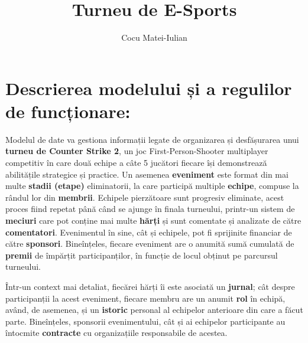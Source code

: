 \documentclass[a4paper,11pt]{article}
\title{\Huge Turneu de E-Sports}
\author{Cocu Matei-Iulian}
\begin{document}
\maketitle

\section{Descrierea modelului și a regulilor de funcționare:}
\quad Modelul de date va gestiona informații legate de organizarea și desfășurarea unui \textbf{turneu de Counter Strike 2}, un joc First-Person-Shooter multiplayer competitiv în care două echipe a câte 5 jucători fiecare își demonstrează abilitățile strategice și practice.
Un asemenea \textbf{eveniment} este format din mai multe \textbf{stadii (etape)} eliminatorii,
la care participă multiple \textbf{echipe}, compuse la rândul lor din \textbf{membrii}. Echipele pierzătoare sunt progresiv eliminate, acest proces fiind repetat până când se ajunge în finala turneului, printr-un sistem de \textbf{meciuri} care pot conține mai multe \textbf{hărți} și sunt comentate și analizate de către \textbf{comentatori}. Evenimentul în sine, cât și echipele, pot fi sprijinite financiar de către \textbf{sponsori}. Bineînțeles, fiecare eveniment are o anumită sumă cumulată de \textbf{premii} de împărțit participanților, în funcție de locul obținut pe parcursul turneului.

\quad Într-un context mai detaliat, fiecărei hărți îi este asociată un \textbf{jurnal}; cât despre participanții la acest eveniment, fiecare membru are un anumit \textbf{rol} în echipă, având, de asemenea, și un \textbf{istoric} personal al echipelor anterioare din care a făcut parte. Bineînțeles, sponsorii evenimentului, cât și ai echipelor participante au întocmite \textbf{contracte} cu organizațiile responsabile de acestea.
\end{document}
